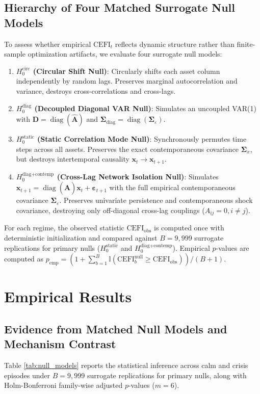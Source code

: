 \documentclass[review,12pt,authoryear]{elsarticle}
\begin{document}
\subsection{Hierarchy of Four Matched Surrogate Null Models}
To assess whether empirical $\mathrm{CEFI}_t$ reflects dynamic structure rather than finite-sample optimization artifacts, we evaluate four surrogate null models:
\begin{enumerate}
    \item \textbf{$H_0^{\text{circ}}$ (Circular Shift Null)}: Circularly shifts each asset column independently by random lags. Preserves marginal autocorrelation and variance, destroys cross-correlations and cross-lags.
    \item \textbf{$H_0^{\text{diag}}$ (Decoupled Diagonal VAR Null)}: Simulates an uncoupled VAR(1) with $\mathbf{D} = \operatorname{diag}(\hat{\mathbf{A}})$ and $\boldsymbol{\Sigma}_{\text{diag}} = \operatorname{diag}(\boldsymbol{\Sigma}_\varepsilon)$.
    \item \textbf{$H_0^{\text{static}}$ (Static Correlation Mode Null)}: Synchronously permutes time steps across all assets. Preserves the exact contemporaneous covariance $\boldsymbol{\Sigma}_x$, but destroys intertemporal causality $\mathbf{x}_t \to \mathbf{x}_{t+1}$.
    \item \textbf{$H_0^{\text{diag+contemp}}$ (Cross-Lag Network Isolation Null)}: Simulates $\mathbf{x}_{t+1} = \operatorname{diag}(\hat{\mathbf{A}})\mathbf{x}_t + \boldsymbol{\varepsilon}_{t+1}$ with the full empirical contemporaneous covariance $\boldsymbol{\Sigma}_\varepsilon$. Preserves univariate persistence and contemporaneous shock covariance, destroying only off-diagonal cross-lag couplings ($A_{ij} = 0, i \neq j$).
\end{enumerate}
For each regime, the observed statistic $\mathrm{CEFI}_{\text{obs}}$ is computed once with deterministic initialization and compared against $B=9,999$ surrogate replications for primary nulls ($H_0^{\text{static}}$ and $H_0^{\text{diag+contemp}}$). Empirical $p$-values are computed as $p_{\text{emp}} = (1 + \sum_{b=1}^B \mathbb{I}(\mathrm{CEFI}_b^{\text{null}} \ge \mathrm{CEFI}_{\text{obs}}))/(B + 1)$.

\section{Empirical Results}
\label{sec:results}

\subsection{Evidence from Matched Null Models and Mechanism Contrast}
Table \ref{tab:null_models} reports the statistical inference across calm and crisis episodes under $B=9,999$ surrogate replications for primary nulls, along with Holm-Bonferroni family-wise adjusted $p$-values ($m=6$).
\end{document}
